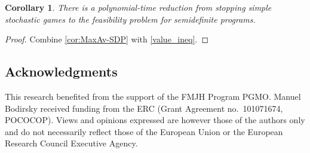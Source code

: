 \documentclass[11pt]{article}
\newtheorem{corollary}[theorem]{Corollary}
\theoremstyle{definition}
\theoremstyle{remark}
\begin{document}
\begin{corollary}
    There is a polynomial-time reduction from stopping simple stochastic games to the feasibility problem for semidefinite programs. 
\end{corollary}
\begin{proof}
    Combine \cref{cor:MaxAv-SDP} with \cref{value_ineq}.
\end{proof}

\subsection*{Acknowledgments}
This research benefited from the support of the FMJH Program PGMO.
Manuel Bodirsky received funding from the ERC (Grant Agreement no.\ 101071674, POCOCOP). Views and opinions expressed are however those of the authors only and do not necessarily reflect those of the European Union or the European Research Council Executive Agency.



\end{document}
